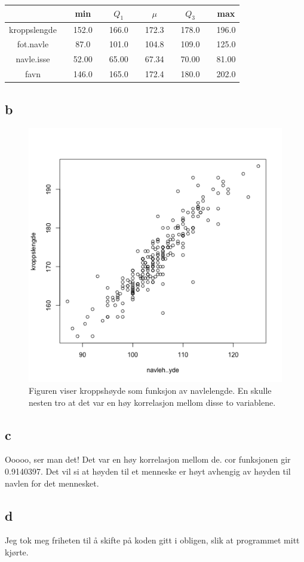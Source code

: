 \begin{center}
\label{tab:summary}
\begin{tabularx}{\textwidth}{c X c X c X c X c X c }
    \hline
    \hline
         && min && $Q_1$ && $\mu$ && $Q_3$ && max \\
    \hline
    kroppslengde   	&& 152.0 && 166.0 && 172.3 && 178.0 && 196.0 \\
    fot.navle    	&&  87.0 && 101.0 && 104.8 && 109.0 && 125.0 \\
    navle.isse	 	&& 52.00 && 65.00 && 67.34 && 70.00 && 81.00 \\
    favn			&& 146.0 && 165.0 && 172.4 && 180.0 && 202.0 \\

    \hline
\end{tabularx}
\end{center}

\subsection*{b}

\begin{figure}[H]
		\centering
		\includegraphics[width=0.4\linewidth]{3B.pdf}
		\caption{Figuren viser kroppshøyde som funksjon av navlelengde. En skulle nesten tro at det var en høy korrelasjon mellom disse to variablene.}
		\label{fig:3B}
\end{figure}



\subsection*{c}
Ooooo, ser man det! Det var en høy korrelasjon mellom de.
cor funksjonen gir 0.9140397. Det vil si at høyden til et menneske er høyt avhengig av høyden til navlen for det mennesket. 

\subsection*{d}
Jeg tok meg friheten til å skifte på koden gitt i obligen, slik at programmet mitt kjørte. 


